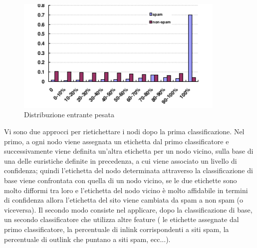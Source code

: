 \begin{itemize}
 \begin{figure}
 \centering
\includegraphics[width=10cm]{immagini/gan/immagine3.png}
\caption{Distribuzione entrante pesata}
\label{img:gan3}
\end{figure}
\end{itemize}
Vi sono due approcci per rietichettare i nodi dopo la prima classificazione. Nel primo, a ogni nodo viene assegnata un etichetta dal primo classificatore e successivamente viene definita un'altra etichetta per un nodo vicino, sulla base di una delle euristiche definite in precedenza, a cui viene associato un livello di confidenza; quindi l'etichetta del nodo determinata attraverso la classificazione di base viene confrontata con quella di un nodo vicino, se le due etichette sono molto difformi tra loro e l'etichetta del nodo vicino è molto affidabile in termini di confidenza allora l’etichetta del sito viene cambiata da spam a non spam (o viceversa). Il secondo modo consiste nel applicare, dopo la classificazione di base, un secondo classificatore che utilizza altre feature ( le etichette assegnate dal primo classificatore, la percentuale di inlink corrispondenti a siti spam, la percentuale di outlink che puntano a siti spam, ecc...).

